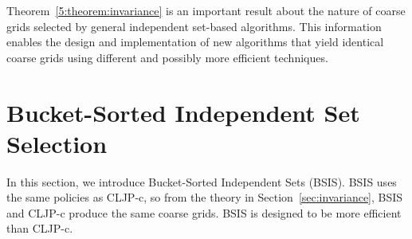 \documentclass{elsart}
\begin{document}
Theorem~\ref{5:theorem:invariance} is an important result about the
nature of coarse grids selected by general independent set-based
algorithms. This information enables the design and implementation of
new algorithms that yield identical coarse grids using different and
possibly more efficient techniques.

\section{Bucket-Sorted Independent Set Selection}
\label{sec:bsis}
In this section, we introduce Bucket-Sorted Independent Sets
(BSIS). BSIS uses the same policies as CLJP-c, so from the theory in
Section~\ref{sec:invariance}, BSIS and CLJP-c produce the same coarse
grids. BSIS is designed to be more efficient than CLJP-c.
\end{document}
